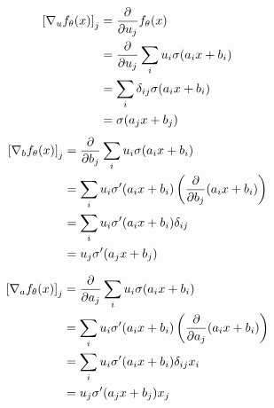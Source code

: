 \documentclass[10pt]{article}
\begin{document}
\begin{align*}
    \left[\nabla_u f_\theta(x)\right]_j &= {\partial \over \partial u_j} f_\theta(x) \\
    &= {\partial \over \partial u_j} \sum_i u_i \sigma(a_ix + b_i) \\
    &= \sum_i \delta_{ij} \sigma(a_ix + b_i)\\
    &= \sigma(a_jx + b_j)
\end{align*}
\begin{align*}
    \left[\nabla_b f_\theta(x)\right]_j &= {\partial \over \partial b_j} \sum_i u_i \sigma(a_ix + b_i) \\
    &= \sum_i u_i \sigma^\prime(a_ix + b_i)\left({\partial \over \partial b_j} (a_ix + b_i)\right) \\
    &= \sum_i u_i \sigma^\prime(a_ix + b_i)\delta_{ij}\\
    & = u_j \sigma^\prime(a_jx + b_j)
\end{align*}

\begin{align*}
    \left[\nabla_a f_\theta(x)\right]_j &= {\partial \over \partial a_j} \sum_i u_i \sigma(a_ix + b_i) \\
    &= \sum_i u_i \sigma^\prime(a_ix + b_i)\left({\partial \over \partial a_j} (a_ix + b_i)\right) \\
    &= \sum_i u_i \sigma^\prime(a_ix + b_i)\delta_{ij}x_i\\
    &= u_j \sigma^\prime(a_jx + b_j)x_j
\end{align*}
\clearpage
\end{document}
